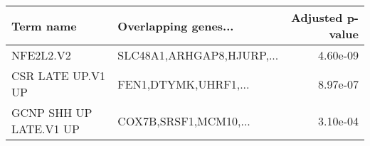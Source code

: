 \begin{tabular}{llr}
\toprule
             Term name &      Overlapping genes... &  Adjusted p-value \\
\midrule
             NFE2L2.V2 & SLC48A1,ARHGAP8,HJURP,... &          4.60e-09 \\
     CSR LATE UP.V1 UP &      FEN1,DTYMK,UHRF1,... &          8.97e-07 \\
GCNP SHH UP LATE.V1 UP &     COX7B,SRSF1,MCM10,... &          3.10e-04 \\
\bottomrule
\end{tabular}

